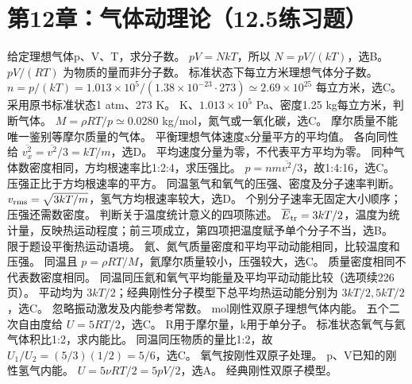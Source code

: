 \section{第12章：气体动理论（12.5练习题）}
\problemtext 给定理想气体p、V、T，求分子数。
\workings $pV=NkT$，所以 $N=pV/(kT)$，选B。
\crosscheck $pV/(RT)$ 为物质的量而非分子数。
\problemtext 标准状态下每立方米理想气体分子数。
\workings $n=p/(kT)=1.013\times10^5/(1.38\times10^{-23}\cdot273)\simeq2.69\times10^{25}$ 每立方米，选C。
\crosscheck 采用原书标准状态1 atm、273 K。
 K、$1.013\times10^5$ Pa、密度1.25 kg每立方米，判断气体。
\workings $M=\rho RT/p\simeq0.0280$ kg/mol，氮气或一氧化碳，选C。
\crosscheck 摩尔质量不能唯一鉴别等摩尔质量的气体。
\problemtext 平衡理想气体速度x分量平方的平均值。
\workings 各向同性给 $\overline{v_x^2}=\overline{v^2}/3=kT/m$，选D。
\crosscheck 平均速度分量为零，不代表平方平均为零。
\problemtext 同种气体数密度相同，方均根速率比1:2:4，求压强比。
\workings $p=nm\overline{v^2}/3$，故1:4:16，选C。
\crosscheck 压强正比于方均根速率的平方。
\problemtext 同温氢气和氧气的压强、密度及分子速率判断。
\workings $v_{\rm rms}=\sqrt{3kT/m}$，氢气方均根速率较大，选D。
\crosscheck 个别分子速率无固定大小顺序；压强还需数密度。
\problemtext 判断关于温度统计意义的四项陈述。
\workings $\overline E_{\rm tr}=3kT/2$，温度为统计量，反映热运动程度；前三项成立，第四项把温度赋予单个分子不当，选B。
\crosscheck 限于题设平衡热运动语境。
\problemtext 氦、氮气质量密度和平均平动动能相同，比较温度和压强。
\workings 同温且 $p=\rho RT/M$，氦摩尔质量较小，压强较大，选C。
\crosscheck 质量密度相同不代表数密度相同。
\problemtext 同温同压氦和氧气平均能量及平均平动动能比较（选项续226页）。
\workings 平动均为 $3kT/2$；经典刚性分子模型下总平均热运动能分别为 $3kT/2,5kT/2$，选C。
\crosscheck 忽略振动激发及内能参考常数。
 mol刚性双原子理想气体内能。
\workings 五个二次自由度给 $U=5RT/2$，选C。
\crosscheck R用于摩尔量，k用于单分子。
\problemtext 标准状态氧气与氦气体积比1:2，求内能比。
\workings 同温同压物质的量比1:2，故 $U_1/U_2=(5/3)(1/2)=5/6$，选C。
\crosscheck 氧气按刚性双原子处理。
\problemtext p、V已知的刚性氢气内能。
\workings $U=5\nu RT/2=5pV/2$，选A。
\crosscheck 经典刚性双原子模型。
